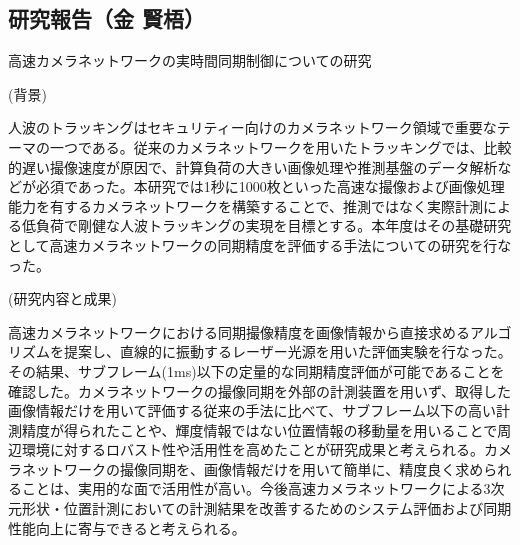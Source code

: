 \subsection{研究報告（金 賢梧）}

高速カメラネットワークの実時間同期制御についての研究

(背景)

人波のトラッキングはセキュリティー向けのカメラネットワーク領域で重要なテーマの一つである。従来のカメラネットワークを用いたトラッキングでは、比較的遅い撮像速度が原因で、計算負荷の大きい画像処理や推測基盤のデータ解析などが必須であった。本研究では1秒に1000枚といった高速な撮像および画像処理能力を有するカメラネットワークを構築することで、推測ではなく実際計測による低負荷で剛健な人波トラッキングの実現を目標とする。本年度はその基礎研究として高速カメラネットワークの同期精度を評価する手法についての研究を行なった。

(研究内容と成果)

高速カメラネットワークにおける同期撮像精度を画像情報から直接求めるアルゴリズムを提案し、直線的に振動するレーザー光源を用いた評価実験を行なった。その結果、サブフレーム(1ms)以下の定量的な同期精度評価が可能であることを確認した。カメラネットワークの撮像同期を外部の計測装置を用いず、取得した画像情報だけを用いて評価する従来の手法に比べて、サブフレーム以下の高い計測精度が得られたことや、輝度情報ではない位置情報の移動量を用いることで周辺環境に対するロバスト性や活用性を高めたことが研究成果と考えられる。カメラネットワークの撮像同期を、画像情報だけを用いて簡単に、精度良く求められることは、実用的な面で活用性が高い。今後高速カメラネットワークによる3次元形状・位置計測においての計測結果を改善するためのシステム評価および同期性能向上に寄与できると考えられる。